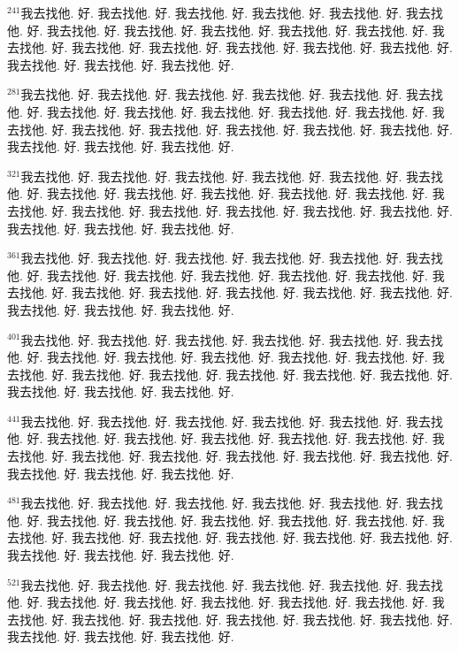 \documentclass{book}
\begin{document}
$^{241}$我去找他.
好.
我去找他.
好.
我去找他.
好.
我去找他.
好.
我去找他.
好.
我去找他.
好.
我去找他.
好.
我去找他.
好.
我去找他.
好.
我去找他.
好.
我去找他.
好.
我去找他.
好.
我去找他.
好.
我去找他.
好.
我去找他.
好.
我去找他.
好.
我去找他.
好.
我去找他.
好.
我去找他.
好.
我去找他.
好.

$^{281}$我去找他.
好.
我去找他.
好.
我去找他.
好.
我去找他.
好.
我去找他.
好.
我去找他.
好.
我去找他.
好.
我去找他.
好.
我去找他.
好.
我去找他.
好.
我去找他.
好.
我去找他.
好.
我去找他.
好.
我去找他.
好.
我去找他.
好.
我去找他.
好.
我去找他.
好.
我去找他.
好.
我去找他.
好.
我去找他.
好.

$^{321}$我去找他.
好.
我去找他.
好.
我去找他.
好.
我去找他.
好.
我去找他.
好.
我去找他.
好.
我去找他.
好.
我去找他.
好.
我去找他.
好.
我去找他.
好.
我去找他.
好.
我去找他.
好.
我去找他.
好.
我去找他.
好.
我去找他.
好.
我去找他.
好.
我去找他.
好.
我去找他.
好.
我去找他.
好.
我去找他.
好.

$^{361}$我去找他.
好.
我去找他.
好.
我去找他.
好.
我去找他.
好.
我去找他.
好.
我去找他.
好.
我去找他.
好.
我去找他.
好.
我去找他.
好.
我去找他.
好.
我去找他.
好.
我去找他.
好.
我去找他.
好.
我去找他.
好.
我去找他.
好.
我去找他.
好.
我去找他.
好.
我去找他.
好.
我去找他.
好.
我去找他.
好.

$^{401}$我去找他.
好.
我去找他.
好.
我去找他.
好.
我去找他.
好.
我去找他.
好.
我去找他.
好.
我去找他.
好.
我去找他.
好.
我去找他.
好.
我去找他.
好.
我去找他.
好.
我去找他.
好.
我去找他.
好.
我去找他.
好.
我去找他.
好.
我去找他.
好.
我去找他.
好.
我去找他.
好.
我去找他.
好.
我去找他.
好.

$^{441}$我去找他.
好.
我去找他.
好.
我去找他.
好.
我去找他.
好.
我去找他.
好.
我去找他.
好.
我去找他.
好.
我去找他.
好.
我去找他.
好.
我去找他.
好.
我去找他.
好.
我去找他.
好.
我去找他.
好.
我去找他.
好.
我去找他.
好.
我去找他.
好.
我去找他.
好.
我去找他.
好.
我去找他.
好.
我去找他.
好.

$^{481}$我去找他.
好.
我去找他.
好.
我去找他.
好.
我去找他.
好.
我去找他.
好.
我去找他.
好.
我去找他.
好.
我去找他.
好.
我去找他.
好.
我去找他.
好.
我去找他.
好.
我去找他.
好.
我去找他.
好.
我去找他.
好.
我去找他.
好.
我去找他.
好.
我去找他.
好.
我去找他.
好.
我去找他.
好.
我去找他.
好.

$^{521}$我去找他.
好.
我去找他.
好.
我去找他.
好.
我去找他.
好.
我去找他.
好.
我去找他.
好.
我去找他.
好.
我去找他.
好.
我去找他.
好.
我去找他.
好.
我去找他.
好.
我去找他.
好.
我去找他.
好.
我去找他.
好.
我去找他.
好.
我去找他.
好.
我去找他.
好.
我去找他.
好.
我去找他.
好.
我去找他.
好.
\end{document}
